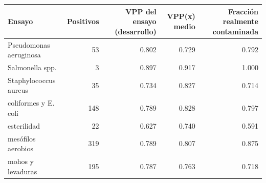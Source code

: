 \begin{tabular}{lrrrr}
\toprule
Ensayo & Positivos & VPP del ensayo (desarrollo) & VPP(x) medio & Fracción realmente contaminada \\
\midrule
Pseudomonas aeruginosa & 53 & 0.802 & 0.729 & 0.792 \\
Salmonella spp. & 3 & 0.897 & 0.917 & 1.000 \\
Staphylococcus aureus & 35 & 0.734 & 0.827 & 0.714 \\
coliformes y E. coli & 148 & 0.789 & 0.828 & 0.797 \\
esterilidad & 22 & 0.627 & 0.740 & 0.591 \\
mesófilos aerobios & 319 & 0.789 & 0.807 & 0.875 \\
mohos y levaduras & 195 & 0.787 & 0.763 & 0.718 \\
\bottomrule
\end{tabular}
